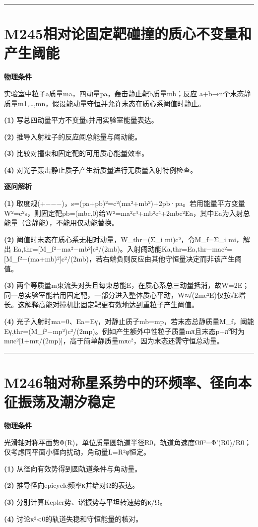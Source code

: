 \documentclass[UTF8,a4paper,11pt,oneside,openany]{ctexbook}
\begin{document}
\par\bigskip\hrule\bigskip
\section*{M245\quad 相对论固定靶碰撞的质心不变量和产生阈能}
\textbf{物理条件}\par 实验室中粒子a质量ma，四动量pa，轰击静止靶b质量mb；反应 a+b→n个末态静质量m1,…,mn，假设能动量守恒并允许末态在质心系阈值时静止。
\par\noindent\textbf{(1)} 写总四动量平方不变量s并用实验室能量表达。
\par\noindent\textbf{(2)} 推导入射粒子的反应阈总能量与阈动能。
\par\noindent\textbf{(3)} 比较对撞束和固定靶的可用质心能量效率。
\par\noindent\textbf{(4)} 对光子轰击静止质子产生新质量进行无质量入射特例检查。

\par\medskip\noindent\textbf{逐问解析}
\par\noindent\textbf{(1)} 取度规(+−−−)，s=(pa+pb)²=c²(ma²+mb²)+2pb·pa。若用能量平方变量W²=c²s，则固定靶pb=(mbc,0)给W²=ma²c⁴+mb²c⁴+2mbc²Ea，其中Ea为入射总能量（含静能），不能用仅动能替换。
\par\noindent\textbf{(2)} 阈值时末态在质心系无相对动量，W\_thr=(Σ\_i mi)c²，令M\_f=Σ\_i mi，解出 Ea,thr=[M\_f²−ma²−mb²]c²/(2mb)。入射阈动能Ka,thr=Ea,thr−mac²=[M\_f²−(ma+mb)²]c²/(2mb)，若右端负则反应由其他守恒量决定而非该产生阈值。
\par\noindent\textbf{(3)} 两个等质量m束流头对头且每束总能E，在质心系总三动量抵消，故W=2E；同一总实验室能若用固定靶，一部分进入整体质心平动，W≈√(2mc²E)仅按√E增长。这解释高能对撞机比固定靶更有效地达到重粒子产生阈值。
\par\noindent\textbf{(4)} 光子入射时ma=0、Ea=Eγ，对静止质子mb=mp，若末态总静质量M\_f，阈能 Eγ,thr=(M\_f²−mp²)c²/(2mp)。例如产生额外中性粒子质量mπ且末态p+π⁰时为mπc²[1+mπ/(2mp)]，高于简单静质量mπc²，因为末态还需守恒总动量。

\par\bigskip\hrule\bigskip
\section*{M246\quad 轴对称星系势中的环频率、径向本征振荡及潮汐稳定}
\textbf{物理条件}\par 光滑轴对称平面势Φ(R)，单位质量圆轨道半径R0，轨道角速度Ω0²=Φ'(R0)/R0；仅考虑同平面小径向扰动，角动量L=R²φ̇恒定。
\par\noindent\textbf{(1)} 从径向有效势得到圆轨道条件与角动量。
\par\noindent\textbf{(2)} 推导径向epicycle频率κ并给对Ω的表达。
\par\noindent\textbf{(3)} 分别计算Kepler势、谐振势与平坦转速势的κ/Ω。
\par\noindent\textbf{(4)} 讨论κ²<0的轨道失稳和守恒能量的核对。
\end{document}
